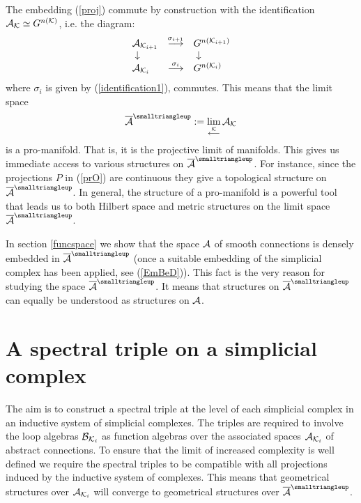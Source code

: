 \documentclass[12pt]{article}
\newcommand{\nn}{\nonumber}
\def\s{\sigma}
\def\ca{{\cal A}}
\def\cb{{\cal B}}
\def\ck{{\cal K}}
\begin{document}
The embedding (\ref{proj}) commute by construction with the identification $\ca_\ck\simeq G^{n(\ck)}$, i.e. the diagram:
\begin{equation}
\begin{array}{lcl}
\ca_{\ck_{i+1}} & \stackrel{\s_{i+1}}{\longrightarrow} & G^{n(\ck_{i+1})}\nn\\
\;\downarrow &&\;\downarrow\nn\\
\ca_{\ck_{i}} & \stackrel{\s_{i}}{\longrightarrow} & G^{n(\ck_i)}\nn\\
\end{array}
\end{equation}
where $\s_i$ is given by (\ref{identification1}), commutes. This means that the limit space
\[
\overline{\ca}^{\smalltriangleup}:=\lim_{\stackrel{\ck}{\longleftarrow}}\ca_\ck
\]
is a pro-manifold. That is, it is the projective limit of manifolds. This gives us immediate access to various structures on $\overline{\ca}^{\smalltriangleup}$.
For instance, since the projections $P$ in (\ref{prO}) are continuous they give a topological structure on $\overline{\ca}^{\smalltriangleup}$. In general, the structure of a pro-manifold is a powerful tool that leads us to both Hilbert space and metric structures on the limit space  $\overline{\ca}^{\smalltriangleup}$. 

In section \ref{funcspace} we show that the space $\ca$ of smooth connections is densely embedded in $\overline{\ca}^{\smalltriangleup}$ (once a suitable embedding of the simplicial complex has been applied, see (\ref{EmBeD})). This fact is the very reason for studying the space $\overline{\ca}^{\smalltriangleup}$. It means that structures on $\overline{\ca}^{\smalltriangleup}$ can equally be understood as structures on $\ca$. 







\section{A spectral triple on a simplicial complex}
\label{sec14}



The aim is to construct a spectral triple at the level of each simplicial complex in an inductive system of simplicial complexes. The triples are required to involve the loop algebras $\cb_{\ck_i}$ as function algebras over the associated spaces $\ca_{\ck_i}$ of abstract connections. To ensure that the limit of increased complexity is well defined we require the spectral triples to be compatible with all projections induced by the inductive system of complexes. This means that geometrical structures over $\ca_{\ck_i}$ will converge to geometrical structures over $\overline{\ca}^{\smalltriangleup}$.
\end{document}
